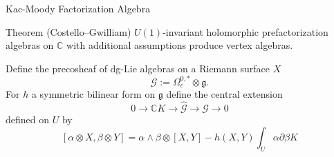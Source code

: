 \documentclass{beamer}
\newcommand{\C}{\mathbb{C}}
\newcommand{\Z}{\mathbb{Z}}
\begin{document}




\begin{frame}{Kac-Moody Factorization Algebra}

    \begin{block}{Theorem (Costello--Gwilliam)}
        $U(1)$-invariant holomorphic prefactorization algebras on $\C$ with additional assumptions produce vertex algebras.
    \end{block}


    Define the precosheaf of dg-Lie algebras on a Riemann surface $X$
    \[
        \mathcal{G}:= \Omega^{0,*}_c \otimes \mathfrak{g}.
    \]
    For $h$ a symmetric bilinear form on $\mathfrak{g}$ define the central extension
    \[
        0 \to \C K \to \hat{\mathcal{G}} \to \mathcal{G} \to 0
    \]
    defined on $U$ by
    \[
        [\alpha \otimes X,\beta\otimes Y] = \alpha \wedge \beta \otimes [X,Y] - h(X,Y) \int_{U} \alpha \partial \beta  K
    \]

\end{frame}
\end{document}
